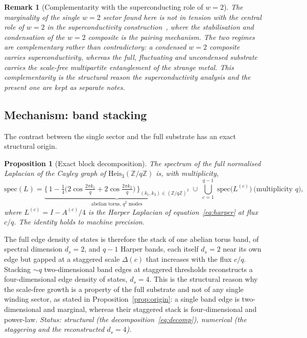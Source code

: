 \documentclass[11pt]{article}
\newtheorem{proposition}{Proposition}
\newtheorem{remark}{Remark}
\newcommand{\Heis}{\mathrm{Heis}_3(\mathbb{Z}/q\mathbb{Z})}
\begin{document}
\begin{remark}[Complementarity with the superconducting role of $w=2$]
The marginality of the single $w=2$ sector found here is not in tension with the central role of $w=2$ in the
superconductivity construction~\cite{Beau2026g}, where the stabilisation and condensation of the $w=2$ composite is
the pairing mechanism.
The two regimes are complementary rather than contradictory: a condensed $w=2$ composite carries superconductivity,
whereas the full, fluctuating and uncondensed substrate carries the scale-free multipartite entanglement of the
strange metal.
This complementarity is the structural reason the superconductivity analysis and the present one are kept as separate
notes.
\end{remark}

\subsection{Mechanism: band stacking}
\label{sec:stacking}

The contrast between the single sector and the full substrate has an exact structural origin.

\begin{proposition}[Exact block decomposition]
\label{prop:decomp}
The spectrum of the full normalised Laplacian of the Cayley graph of $\Heis$ is, with multiplicity,
\begin{equation}
\mathrm{spec}(L) =
\underbrace{\Big\{\,1-\tfrac14\big(2\cos\tfrac{2\pi k_1}{q}+2\cos\tfrac{2\pi k_2}{q}\big)\,\Big\}_{
(k_1,k_2)\in(\mathbb{Z}/q\mathbb{Z})^2}}_{\text{abelian torus, } q^2 \text{ modes}}
\;\cup\; \bigcup_{c=1}^{q-1}\;\mathrm{spec}\big(L^{(c)}\big)\ \text{(multiplicity } q),
\label{eq:decomp}
\end{equation}
where $L^{(c)}=I-A^{(c)}/4$ is the Harper Laplacian of equation~\eqref{eq:harper} at flux $c/q$.
The identity holds to machine precision.
\end{proposition}

The full edge density of states is therefore the stack of one abelian torus band, of spectral dimension $d_s=2$,
and $q-1$ Harper bands, each itself $d_s=2$ near its own edge but gapped at a staggered scale $\Delta(c)$ that
increases with the flux $c/q$.
Stacking $\sim q$ two-dimensional band edges at staggered thresholds reconstructs a four-dimensional edge density
of states, $d_s=4$.
This is the structural reason why the scale-free growth is a property of the full substrate and not of any single
winding sector, as stated in Proposition~\ref{prop:origin}: a single band edge is two-dimensional and marginal,
whereas their staggered stack is four-dimensional and power-law.
\emph{Status: structural (the decomposition~\eqref{eq:decomp}), numerical (the staggering and the reconstructed
$d_s=4$).}
\end{document}
